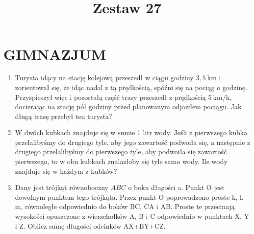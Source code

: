 \documentclass[10pt]{article}
\title{Zestaw 27 }
\author{}
\date{}
\begin{document}
\maketitle
\section*{GIMNAZJUM}
\begin{enumerate}
  \item Turysta idący na stację kolejową przeszedł w ciągu godziny \(3,5 \mathrm{~km}\) i zorientował się, że idąc nadal z tą prędkością, spóźni się na pociąg o godzinę. Przyspieszył więc i pozostałą część trasy przeszedł z prędkością \(5 \mathrm{~km} / \mathrm{h}\), docierając na stację pół godziny przed planowanym odjazdem pociągu. Jak długą trasę przebył ten turysta?
  \item W dwóch kubkach znajduje się w sumie 1 litr wody. Jeśli z pierwszego kubka przelalibyśmy do drugiego tyle, aby jego zawartość podwoiła się, a następnie z drugiego przelalibyśmy do pierwszego tyle, aby podwoiła się zawartość pierwszego, to w obu kubkach znalazłoby się tyle samo wody. Ile wody znajduje się w każdym z kubków?
  \item Dany jest trójkąt równoboczny \(A B C\) o boku długości a. Punkt O jest dowolnym punktem tego trójkąta. Przez punkt O poprowadzono proste k, l, m, równoległe odpowiednio do boków BC, CA i AB. Proste te przecinają wysokości opuszczone z wierzchołków A, B i C odpowiednio w punktach X, Y i Z. Oblicz sumę długości odcinków AX+BY+CZ.
\end{enumerate}
\end{document}
